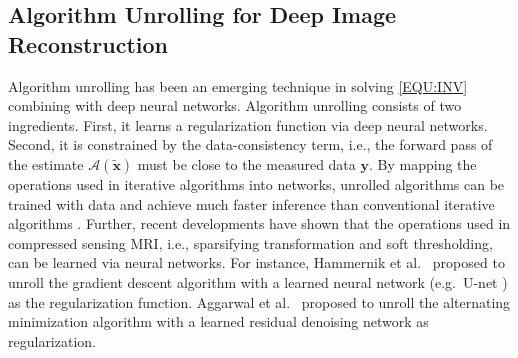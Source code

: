 \documentclass[journal,twoside,web]{ieeecolor}
\newcommand{\argmin}{\operatornamewithlimits{argmin}}
\newcommand{\norm}[1]{\left\lVert#1\right\rVert}
\begin{document}
	\subsection{Algorithm Unrolling for Deep Image Reconstruction}

	Algorithm unrolling has been an emerging technique
	in solving \cref{EQU:INV} combining with deep neural networks.
    Algorithm unrolling consists of two ingredients.
	First, it learns a regularization function
	via deep neural networks.
	Second, it is constrained
	by the data-consistency term,
	i.e., the forward pass of the estimate $\mathcal{A} (\mathbf{\tilde{x}})$
	must be close to the measured data $\mathbf{y}$.
    By mapping the operations used in iterative algorithms
    into networks, unrolled algorithms can be trained with data
    and achieve much faster inference
    than conventional iterative algorithms \cite{monga_2021_algunroll}.
    Further, recent developments have shown that
    the operations used in compressed sensing MRI,
    i.e., sparsifying transformation and soft thresholding,
    can be learned via neural networks.
    For instance, Hammernik et al.~\cite{hammernik_2018_varnet}
    proposed to unroll the gradient descent algorithm
    with a learned neural network
    (e.g.~U-net \cite{ronneberger_2015_unet})
    as the regularization function.
    Aggarwal et al.~\cite{aggarwal_2018_modl} proposed to
    unroll the alternating minimization algorithm
    with a learned residual denoising network \cite{he_2016_resnet}
    as regularization.

\end{document}
